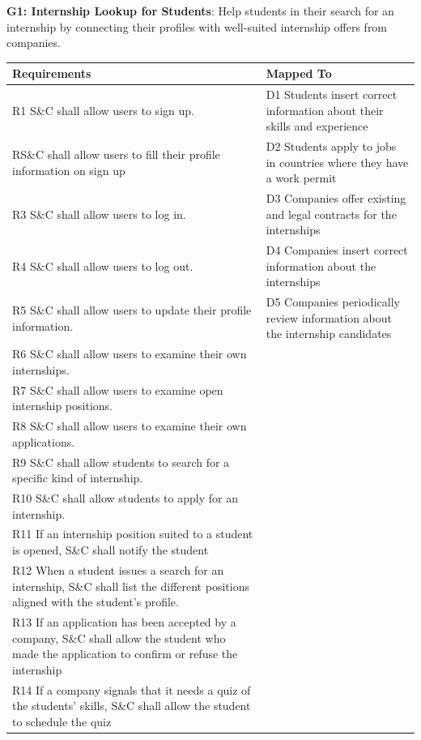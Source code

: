 \begin{enumerate}[label={[G\arabic*]}]
\item \textbf{G1: Internship Lookup for Students}: 
                Help students in their search for an internship by connecting their profiles with well-suited internship offers from companies.

\begin{longtable}{|p{8cm}|p{8cm}|}
\hline
\rowcolor[HTML]{CFE2F3} 
\textbf{Requirements} & \textbf{Mapped To} \\
\hline
\endfirsthead

\hline
\endfoot

\hline
\endlastfoot
R1 S\&C shall allow users to sign up. & D1 Students insert correct information about their skills and experience \\
RS\&C shall allow users to fill their profile information on sign up & D2 Students apply to jobs in countries where they have a work permit \\
R3 S\&C shall allow users to log in. & D3 Companies offer existing and legal contracts for the internships \\
R4 S\&C shall allow users to log out. & D4 Companies insert correct information about the internships \\
R5 S\&C shall allow users to update their profile information. & D5 Companies periodically review information about the internship candidates \\
R6 S\&C shall allow users to examine their own internships. & \\
R7 S\&C shall allow users to examine open internship positions.  & \\%
R8 S\&C shall allow users to examine their own applications. & \\
R9 S\&C shall allow students to search for a specific kind of internship.  & \\ 
R10 S\&C shall allow students to apply for an internship.     & \\
R11 If an internship position suited to a student is opened, S\&C shall notify the student & \\
R12 When a student issues a search for an internship, S\&C shall list the different positions aligned with the student's profile.  & \\
R13 If an application has been accepted by a company, S\&C shall allow the student who made the application to confirm or refuse the internship & \\
R14 If a company signals that it needs a quiz of the students' skills, S\&C shall allow the student to schedule the quiz & \\

\end{longtable}
\end{enumerate}
